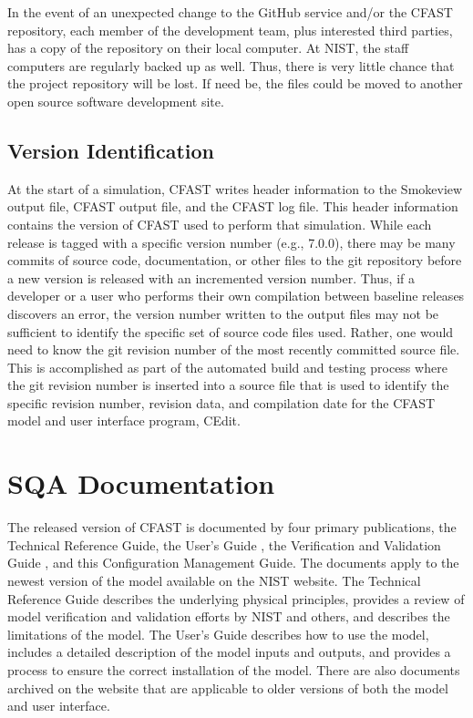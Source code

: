 \documentclass[12pt]{book}
\begin{document}
In the event of an unexpected change to the GitHub service and/or the CFAST repository, each member of the development team, plus interested third parties, has a copy of the repository on their local computer. At NIST, the staff computers are regularly backed up as well. Thus, there is very little chance that the project repository will be lost. If need be, the files could be moved to another open source software development site.

\section{Version Identification}

At the start of a simulation, CFAST writes header information to the Smokeview output file, CFAST output file, and the CFAST log file.  This header information contains the version of CFAST used to perform that simulation. While each release is tagged with a specific version number (e.g., 7.0.0), there may be many commits of source code, documentation, or other files to the git repository before a new version is released with an incremented version number.  Thus, if a developer or a user who performs their own compilation between baseline releases discovers an error, the version number written to the output files may not be sufficient to identify the specific set of source code files used.  Rather, one would need to know the git revision number of the most recently committed source file. This is accomplished as part of the automated build and testing process where the git revision number is inserted into a source file that is used to identify the specific revision number, revision data, and compilation date for the CFAST model and user interface program, CEdit.


\chapter{SQA Documentation}

The released version of CFAST is documented by four primary publications, the Technical Reference Guide\cite{CFAST_Tech_Guide_7}, the User's Guide \cite{CFAST_Users_Guide_7}, the Verification and Validation Guide \cite{CFAST_Valid_Guide_7}, and this Configuration Management Guide. The documents apply to the newest version of the model available on the NIST website. The Technical Reference Guide describes the underlying physical principles, provides a review of model verification and validation efforts by NIST and others, and describes the limitations of the model.  The User's Guide describes how to use the model, includes a detailed description of the model inputs and outputs, and provides a process to ensure the correct installation of the model. There are also documents archived on the website that are applicable to older versions of both the model and user interface.
\end{document}
